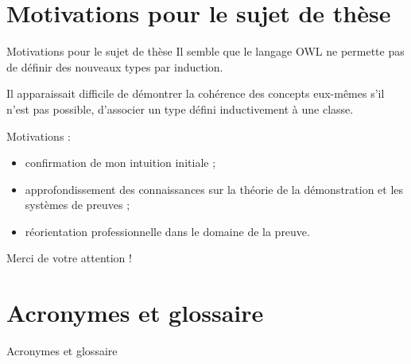 \documentclass[
  hyperref={
    pdfusetitle,
    pdfencoding=auto,
    psdextra,
    colorlinks=true,
    linkcolor=darkblue,
    citecolor=darkred,
    urlcolor=darkblue,
  },
  9pt,
  aspectratio=169,
]{beamer}
\begin{document}
\section{Motivations pour le sujet de thèse}

\begin{frame}{Motivations pour le sujet de thèse}
  Il semble que le langage \gls{OWL} ne permette pas
  de définir des nouveaux types par induction.

  Il apparaissait difficile de démontrer la cohérence des concepts eux-mêmes
  s'il n'est pas possible,
  d'associer un type défini inductivement à une classe.

  Motivations :
  \begin{itemize}
    \item
      confirmation de mon intuition initiale ;
    \item
      approfondissement des connaissances
      sur la théorie de la démonstration et les systèmes de preuves ;
    \item
      réorientation professionnelle dans le domaine de la preuve.
  \end{itemize}

\end{frame}

\begin{frame}[standout]
  Merci de votre attention !
\end{frame}


\section*{Acronymes et glossaire}
\begin{frame}[allowframebreaks]{Acronymes et glossaire}
  \printglossary[style=listgroup, type=\acronymtype]
  \printglossary[style=listgroup, type=main]
\end{frame}

\end{document}
